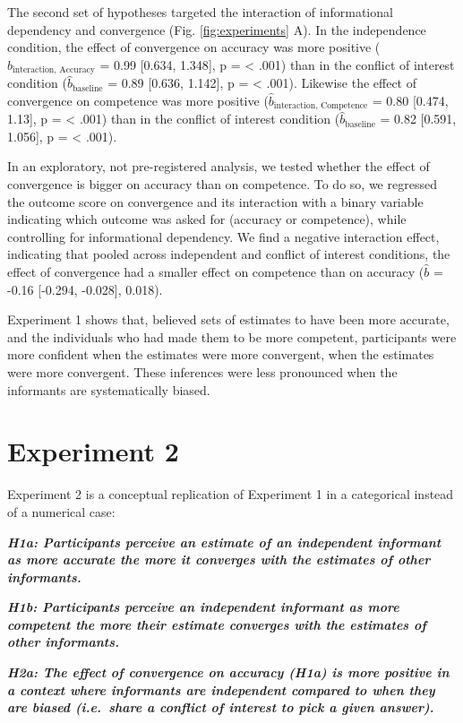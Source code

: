 \documentclass[
  doc,floatsintext]{apa6}
\begin{document}
The second set of hypotheses targeted the interaction of informational dependency and convergence (Fig. \ref{fig:experiments} A). In the independence condition, the effect of convergence on accuracy was more positive (\(\hat{b}_{\text{interaction, Accuracy}}\) = 0.99 {[}0.634, 1.348{]}, p = \textless{} .001) than in the conflict of interest condition (\(\hat{b}_{\text{baseline}}\) = 0.89 {[}0.636, 1.142{]}, p = \textless{} .001). Likewise the effect of convergence on competence was more positive (\(\hat{b}_{\text{interaction, Competence}}\) = 0.80 {[}0.474, 1.13{]}, p = \textless{} .001) than in the conflict of interest condition (\(\hat{b}_{\text{baseline}}\) = 0.82 {[}0.591, 1.056{]}, p = \textless{} .001).

In an exploratory, not pre-registered analysis, we tested whether the effect of convergence is bigger on accuracy than on competence. To do so, we regressed the outcome score on convergence and its interaction with a binary variable indicating which outcome was asked for (accuracy or competence), while controlling for informational dependency. We find a negative interaction effect, indicating that pooled across independent and conflict of interest conditions, the effect of convergence had a smaller effect on competence than on accuracy (\(\hat{b}\) = -0.16 {[}-0.294, -0.028{]}, 0.018).

Experiment 1 shows that, believed sets of estimates to have been more accurate, and the individuals who had made them to be more competent, participants were more confident when the estimates were more convergent, when the estimates were more convergent. These inferences were less pronounced when the informants are systematically biased.

\hypertarget{experiment-2}{%
\section{Experiment 2}\label{experiment-2}}

Experiment 2 is a conceptual replication of Experiment 1 in a categorical instead of a numerical case:

\textbf{\emph{H1a: Participants perceive an estimate of an independent informant as more accurate the more it converges with the estimates of other informants.}}

\textbf{\emph{H1b: Participants perceive an independent informant as more competent the more their estimate converges with the estimates of other informants.}}

\textbf{\emph{H2a: The effect of convergence on accuracy (H1a) is more positive in a context where informants are independent compared to when they are biased (i.e.~share a conflict of interest to pick a given answer).}}
\end{document}
